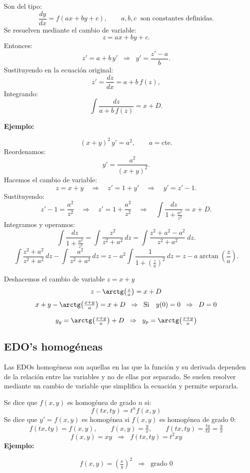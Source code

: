 \documentclass[a4paper,12pt]{article}
\begin{document}
\medskip
\noindent
Son del tipo:
\[
\frac{dy}{dx} = f(ax+by+c),
\qquad a,b,c \;\; \text{son constantes definidas}.
\]
Se resuelven mediante el cambio de variable:
\[
z = ax + by + c.
\]
Entonces:
\[
z' = a + b\,y' 
\;\;\Rightarrow\;\; 
y' = \frac{z'-a}{b}.
\]
Sustituyendo en la ecuación original:
\[
z' = \frac{dz}{dx} = a + b\,f(z),
\]
Integrando:
\[
\int \frac{dz}{a + b\,f(z)} = x + D.
\]

\medskip
\noindent
\textbf{Ejemplo:}

\[
(x+y)^2\,y' = a^2, \qquad a = \text{cte}.
\]
Reordenamos:
\[
y' = \frac{a^2}{(x+y)^2}.
\]
Hacemos el cambio de variable:
\[
z = x+y \quad\Rightarrow\quad z' = 1 + y' \quad\Rightarrow\quad y' = z'-1.
\]
Sustituyendo:
\[
z'-1 = \frac{a^2}{z^2} \quad\Rightarrow\quad z' = 1 + \frac{a^2}{z^2}
\quad\Rightarrow\quad \int \frac{dz}{1 + \frac{a^2}{z^2}} = x + D.
\]
Integramos y operamos:
\[
\int \frac{dz}{1 + \frac{a^2}{z^2}} = \int \frac{z^2}{z^2+a^2}\,dz = \int \frac{z^2+a^2-a^2}{z^2+a^2}\ dz.
\]
\[
\int \frac{z^2+a^2}{z^2+a^2}\,dz - \int \frac{a^2}{z^2+a^2}\,dz
= z-a^2 \int \frac{1}{1+ (\frac{z}{a})^2}\,dz = z - a\arctan\!\left(\frac{z}{a}\right).
\]

\medskip
\noindent
Deshacemos el cambio de variable $z = x+y$
\[
z - \arctg\!\left(\tfrac{z}{a}\right) = x + D
\]
\[
x+y - \arctg\!\left(\tfrac{x+y}{a}\right) = x + D
\;\;\Rightarrow\;\; 
\text{Si} \quad y(0)=0 \;\;\Rightarrow\;\; D=0
\]

\[
y_g = \arctg\!\left(\tfrac{x+y}{a}\right) + D 
\;\;\Rightarrow\;\;
y_p = \arctg\!\left(\tfrac{x+y}{a}\right)
\]

\subsection{EDO’s homogéneas}
\noindent
Las EDOs homogéneas son aquellas en las que la función y su 
derivada dependen de la relación entre las variables y no de 
ellas por separado. Se suelen resolver mediante un cambio de 
variable que simplifica la ecuación y permite separarla.

\medskip
\noindent
Se dice que $f(x,y)$ es homogénea de grado $n$ si:
\[
f(tx,ty) = t^n f(x,y)
\]
Se dice que $y' = f(x,y)$ es homogénea si $f(x,y)$ es homogénea de grado 0:
\[
f(tx,ty) = f(x,y), 
\qquad 
f(x,y) = \tfrac{y}{x},
\qquad
f(tx,ty) = \tfrac{ty}{tx} = \tfrac{y}{x}
\]
\[
f(x,y) = xy \;\;\Rightarrow\;\; f(tx,ty) = t^2 xy
\]
\noindent
\textbf{Ejemplo:}

\[
f(x,y) = \left(\tfrac{x}{y}\right)^2 \;\;\Rightarrow\;\; \text{grado 0}
\]
\end{document}
